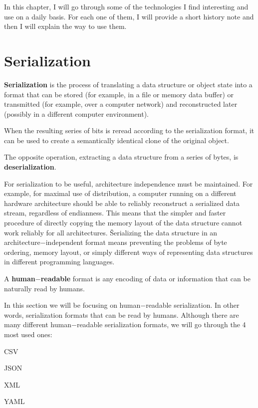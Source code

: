 In this chapter, I will go through some of the technologies I find interesting and use on a daily basis. For each one
of them, I will provide a short history note and then I will explain the way to use them.

\section{Serialization} \label{serialization}

\bd[Serialization]
\textbf{Serialization} is the process of translating a data structure or object state into a format that can be stored
(for example, in a file or memory data buffer) or transmitted (for example, over a computer network) and reconstructed
later (possibly in a different computer environment).
\ed

When the resulting series of bits is reread according to the serialization format, it can be used to create a
semantically identical clone of the original object.

\bd[Deserialization]
The opposite operation, extracting a data structure from a series of bytes, is \textbf{deserialization}.
\ed

For serialization to be useful, architecture independence must be maintained. For example, for maximal use of
distribution, a computer running on a different hardware architecture should be able to reliably reconstruct a
serialized data stream, regardless of endianness. This means that the simpler and faster procedure of directly
copying the memory layout of the data structure cannot work reliably for all architectures. \v

Serializing the data structure in an architecture$-$independent format means preventing the problems of byte
ordering, memory layout, or simply different ways of representing data structures in different programming languages.

A \textbf{human$-$readable} format is any encoding of data or information that can be naturally read by humans.
\ed

In this section we will be focusing on human$-$readable serialization. In other words, serialization formats that can
be read by humans. Although there are many different human$-$readable serialization formats, we will go through the 4
most used ones:
\bit
\item CSV
\item JSON
\item XML
\item YAML
\eit

